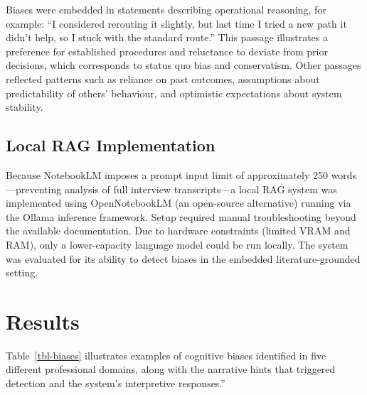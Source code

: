 \documentclass[
  letterpaper,
  DIV=11,
  numbers=noendperiod]{scrartcl}
\begin{document}
Biases were embedded in statements describing operational reasoning, for
example: ``I considered rerouting it slightly, but last time I tried a
new path it didn't help, so I stuck with the standard route.'' This
passage illustrates a preference for established procedures and
reluctance to deviate from prior decisions, which corresponds to status
quo bias and conservatism. Other passages reflected patterns such as
reliance on past outcomes, assumptions about predictability of others'
behaviour, and optimistic expectations about system stability.

\subsection{Local RAG Implementation}\label{local-rag-implementation}

Because NotebookLM imposes a prompt input limit of approximately 250
words---preventing analysis of full interview transcripts---a local RAG
system was implemented using OpenNotebookLM (an open-source alternative)
running via the Ollama inference framework. Setup required manual
troubleshooting beyond the available documentation. Due to hardware
constraints (limited VRAM and RAM), only a lower-capacity language model
could be run locally. The system was evaluated for its ability to detect
biases in the embedded literature-grounded setting.

\section{Results}\label{results}

Table~\ref{tbl-biases} illustrates examples of cognitive biases
identified in five different professional domains, along with the
narrative hints that triggered detection and the system's interpretive
responses.''
\end{document}
